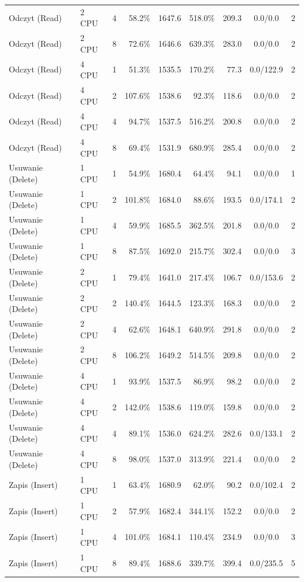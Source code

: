 \begin{table}[ht]
{\begin{tabular}{llcrrrrcc}
Odczyt (Read) & 2 CPU & 4 & 58.2\% & 1647.6 & 518.0\% & 209.3 & 0.0/0.0 & 2 \\
Odczyt (Read) & 2 CPU & 8 & 72.6\% & 1646.6 & 639.3\% & 283.0 & 0.0/0.0 & 2 \\
Odczyt (Read) & 4 CPU & 1 & 51.3\% & 1535.5 & 170.2\% & 77.3 & 0.0/122.9 & 2 \\
Odczyt (Read) & 4 CPU & 2 & 107.6\% & 1538.6 & 92.3\% & 118.6 & 0.0/0.0 & 2 \\
Odczyt (Read) & 4 CPU & 4 & 94.7\% & 1537.5 & 516.2\% & 200.8 & 0.0/0.0 & 2 \\
Odczyt (Read) & 4 CPU & 8 & 69.4\% & 1531.9 & 680.9\% & 285.4 & 0.0/0.0 & 2 \\
Usuwanie (Delete) & 1 CPU & 1 & 54.9\% & 1680.4 & 64.4\% & 94.1 & 0.0/0.0 & 1 \\
Usuwanie (Delete) & 1 CPU & 2 & 101.8\% & 1684.0 & 88.6\% & 193.5 & 0.0/174.1 & 2 \\
Usuwanie (Delete) & 1 CPU & 4 & 59.9\% & 1685.5 & 362.5\% & 201.8 & 0.0/0.0 & 2 \\
Usuwanie (Delete) & 1 CPU & 8 & 87.5\% & 1692.0 & 215.7\% & 302.4 & 0.0/0.0 & 3 \\
Usuwanie (Delete) & 2 CPU & 1 & 79.4\% & 1641.0 & 217.4\% & 106.7 & 0.0/153.6 & 2 \\
Usuwanie (Delete) & 2 CPU & 2 & 140.4\% & 1644.5 & 123.3\% & 168.3 & 0.0/0.0 & 2 \\
Usuwanie (Delete) & 2 CPU & 4 & 62.6\% & 1648.1 & 640.9\% & 291.8 & 0.0/0.0 & 2 \\
Usuwanie (Delete) & 2 CPU & 8 & 106.2\% & 1649.2 & 514.5\% & 209.8 & 0.0/0.0 & 2 \\
Usuwanie (Delete) & 4 CPU & 1 & 93.9\% & 1537.5 & 86.9\% & 98.2 & 0.0/0.0 & 2 \\
Usuwanie (Delete) & 4 CPU & 2 & 142.0\% & 1538.6 & 119.0\% & 159.8 & 0.0/0.0 & 2 \\
Usuwanie (Delete) & 4 CPU & 4 & 89.1\% & 1536.0 & 624.2\% & 282.6 & 0.0/133.1 & 2 \\
Usuwanie (Delete) & 4 CPU & 8 & 98.0\% & 1537.0 & 313.9\% & 221.4 & 0.0/0.0 & 2 \\
Zapis (Insert) & 1 CPU & 1 & 63.4\% & 1680.9 & 62.0\% & 90.2 & 0.0/102.4 & 2 \\
Zapis (Insert) & 1 CPU & 2 & 57.9\% & 1682.4 & 344.1\% & 152.2 & 0.0/0.0 & 2 \\
Zapis (Insert) & 1 CPU & 4 & 101.0\% & 1684.1 & 110.4\% & 234.9 & 0.0/0.0 & 3 \\
Zapis (Insert) & 1 CPU & 8 & 89.4\% & 1688.6 & 339.7\% & 399.4 & 0.0/235.5 & 5 \\

\end{tabular}}
\end{table}
